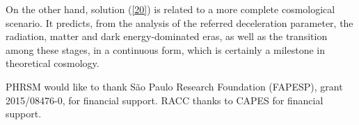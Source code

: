 On the other hand, solution (\ref{20}) is related to a more complete cosmological scenario. It predicts, from the analysis of the referred deceleration parameter, the radiation, matter and dark energy-dominated eras, as well as the transition among these stages, in a continuous form, which is certainly a milestone in theoretical cosmology.

\begin{acknowledgements}
PHRSM would like to thank S\~ao Paulo Research Foundation (FAPESP), grant 2015/08476-0, for financial support. RACC thanks to  CAPES for financial support.
\end{acknowledgements}



